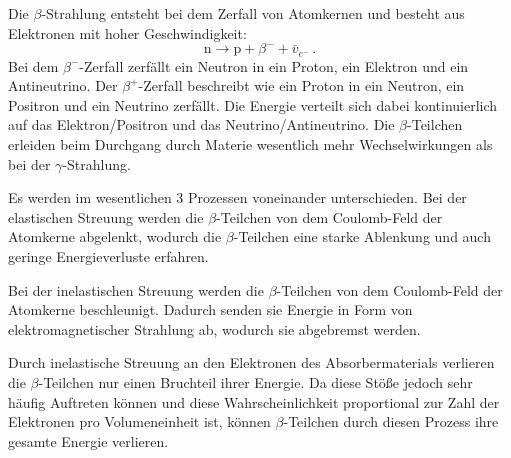 Die $\beta$-Strahlung entsteht bei dem Zerfall von Atomkernen und besteht aus Elektronen mit hoher Geschwindigkeit:
\begin{equation}
    \mathrm{n} \rightarrow \mathrm{p}+\beta^{-}+\bar{v}_{e^{-}} \, .
\end{equation}
Bei dem $\beta^-$-Zerfall zerfällt ein Neutron in ein Proton, ein Elektron und ein Antineutrino.
Der $\beta^+$-Zerfall beschreibt wie ein Proton in ein Neutron, ein Positron und ein Neutrino zerfällt. 
Die Energie verteilt sich dabei kontinuierlich auf das Elektron/Positron und das Neutrino/Antineutrino. 
Die $\beta$-Teilchen erleiden beim Durchgang durch Materie wesentlich mehr Wechselwirkungen als bei der $\gamma$-Strahlung. 

Es werden im wesentlichen 3 Prozessen voneinander unterschieden. 
Bei der elastischen Streuung werden die $\beta$-Teilchen von dem Coulomb-Feld der Atomkerne abgelenkt, 
wodurch die $\beta$-Teilchen eine starke Ablenkung und auch geringe Energieverluste erfahren.

Bei der inelastischen Streuung werden die $\beta$-Teilchen von dem Coulomb-Feld der Atomkerne beschleunigt. 
Dadurch senden sie Energie in Form von elektromagnetischer Strahlung ab, wodurch sie abgebremst werden. 

Durch inelastische Streuung an den Elektronen des Absorbermaterials verlieren die $\beta$-Teilchen nur einen Bruchteil ihrer Energie. 
Da diese Stöße jedoch sehr häufig Auftreten können und diese Wahrscheinlichkeit proportional zur Zahl der Elektronen pro Volumeneinheit ist, 
können $\beta$-Teilchen durch diesen Prozess ihre gesamte Energie verlieren.

